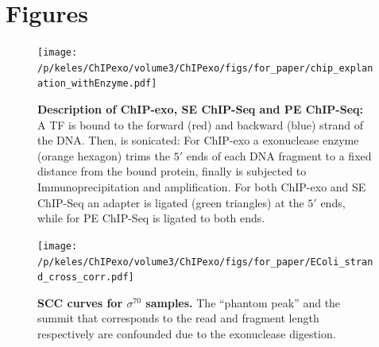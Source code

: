 \documentclass{bmcart}\usepackage[]{graphicx}\usepackage[]{color}
\newcommand{\sig}{\sigma^{70}}
\begin{document}

\nocite{exo_gb}
\nocite{maplot1}
\nocite{maplot2}
\nocite{chipbeyond}



\newpage

\section{Figures}

\begin{figure}[h!]
  \centering
  \texttt{[image: /p/keles/ChIPexo/volume3/ChIPexo/figs/for\_paper/chip\_explanation\_withEnzyme.pdf]}
  \caption{\textbf{Description of ChIP-exo, SE ChIP-Seq and PE
      ChIP-Seq:} A TF is bound to the forward (red) and backward
    (blue) strand of the DNA. Then, is sonicated: For ChIP-exo a
    exonuclease enzyme (orange hexagon) trims the $5\prime$ ends of
    each DNA fragment to a fixed distance from the bound protein,
    finally is subjected to Immunoprecipitation and amplification. For
    both ChIP-exo and SE ChIP-Seq an adapter is ligated (green
    triangles) at the $5\prime$ ends, while for PE ChIP-Seq is ligated
    to both ends.}
  \label{fig:chip_diagram}
\end{figure}
\newpage

\begin{figure}[h!]
\centering
\texttt{[image: /p/keles/ChIPexo/volume3/ChIPexo/figs/for\_paper/EColi\_strand\_cross\_corr.pdf]}
\caption{\textbf{SCC curves for $\sig$ samples.} The ``phantom peak''
  and the summit that corresponds to the read and fragment length
  respectively are confounded due to the exonuclease digestion.}
  \label{fig:scc_exo}
\end{figure}

\newpage
\end{document}
